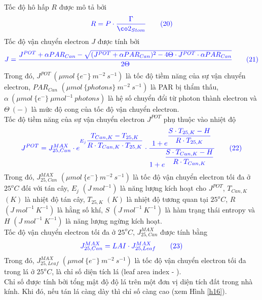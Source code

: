 \documentclass[13pt,a4paper]{article}
\begin{document}
			Tốc độ hô hấp $R$ được mô tả bởi
			\begin{align}
				\color{blue}
					R = P \cdot \dfrac{\Gamma}{\co2_{Stom}}
				\color{blue}
				\tag{20} \label{ct20}
			\end{align}
			Tốc độ vận chuyển electron $J$ được tính bởi
			\begin{align}
				\color{blue}
					J = \dfrac{J^{POT} + \alpha PAR_{Can} - \sqrt{(J^{POT} + \alpha PAR_{Can})^2 - 4\Theta \cdot J^{POT} \cdot \alpha PAR_{Can}}}{2\Theta}
				\color{blue}
				\tag{21} \label{ct21}
			\end{align}
			Trong đó, $J^{POT}\ (\mu mol\ \{e^{-}\}\ m^{-2}\ s^{-1})$ là tốc độ tiềm năng của sự vận chuyển electron, $PAR_{Can}$ $(\mu mol\ \{photons\}\ m^{-2}\ s^{-1})$ là PAR bị thẩm thấu, $\alpha\ (\mu mol\ \{e^{-}\}\ \mu mol^{-1}\ {photons})$ là hệ số chuyển đổi từ photon thành electron và $\Theta\ (-)$ là mức độ cong của tốc độ vận chuyển electron. \\
			Tốc độ tiềm năng của sự vận chuyển electron $J^{POT}$ phụ thuộc vào nhiệt độ
			\begin{align}
				\color{blue}
					J^{POT} = J^{MAX}_{25,Can} \cdot e^{E_j\dfrac{T_{Can,K} - T_{25,K}}{R\cdot T_{Can,K} \cdot T_{25,K}}} \cdot \dfrac{1 + e^{\dfrac{S\cdot T_{25,K} - H}{R\cdot T_{25,K}}}}{1 + e^{\dfrac{S \cdot T_{Can,K} - H}{R\cdot T_{Can,K}}}}
				\color{blue}
				\tag{22} \label{ct22}
			\end{align}
			Trong đó, $J^{MAX}_{25,Can}$ $(\mu mol\ \{e^{-}\}\ m^{-2}\ s^{-1})$ là tốc độ vận chuyển electron tối đa ở $25^oC$ đối với tán cây, $E_j$ $(J\ mol^{-1})$ là năng lượng kích hoạt cho $J^{POT}$, $T_{Can,K}$ $(K)$ là nhiệt độ tán cây, $T_{25,K}$ $(K)$ là nhiệt độ tương quan tại $25^oC$, $R$ $(J\ mol^{-1}\ K^{-1})$ là hằng số khí, $S$ $(J\ mol^{-1}\ K^{-1})$ là hàm trạng thái entropy và $H$ $(J\ mol^{-1}\ K^{-1})$ là năng lượng ngừng kích hoạt. \\
			Tốc độ vận chuyển electron tối đa ở $25^oC$, $J^{MAX}_{25,Can}$  được tính bằng
			\begin{align}
				\color{blue}
					J^{MAX}_{25,Can} = LAI \cdot J^{MAX}_{25,Leaf}
				\color{blue}
				\tag{23} \label{ct23}
			\end{align}
			Trong đó, $J^{MAX}_{25,Leaf}$ $(\mu mol\ \{e^{-}\}\ m^{-2}\ s^{-1})$ là tốc độ vận chuyển electron tối đa trong lá ở $25^oC$, \lai là chỉ số diện tích lá (leaf area index - \lai). \\
			Chỉ số \lai được tính bởi tổng mật độ độ lá trên một đơn vị diện tích đất trong nhà kính. Khi đó, nếu tán lá càng dày thì chỉ số \lai càng cao (xem Hình \ref{h16}).		
\end{document}
